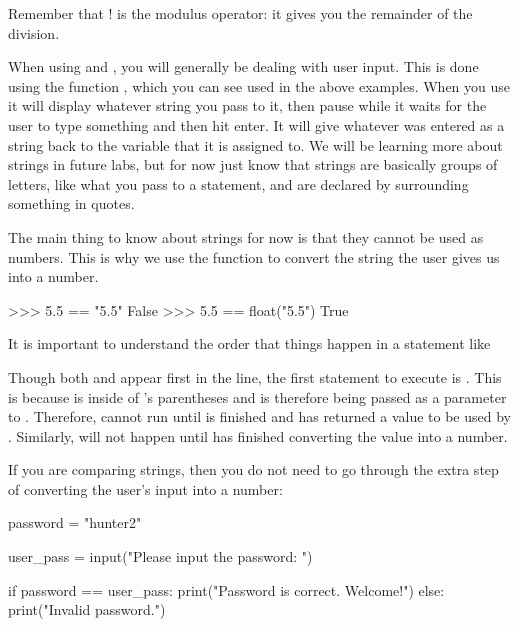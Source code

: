 \documentclass[11pt]{cselabheader}
\begin{document}
Remember that \pythoninline!%
is the modulus operator: it gives you the remainder of the division.

When using  and , you will generally be
dealing with user input. This is done using the function ,
which you can see used in the above examples. When you use 
it will display whatever string you pass to it, then pause while it waits for
the user to type something and then hit enter. It will give whatever was entered
as a string back to the variable that it is assigned to. We will be learning
more about strings in future labs, but for now just know that strings are
basically groups of letters, like what you pass to a 
statement, and are declared by surrounding something in quotes.

The main thing to know about strings for now is that they cannot be used as
numbers. This is why we use the  function to convert the
string the user gives us into a number.

\begin{pyconcode}
>>> 5.5 == "5.5"
False
>>> 5.5 == float("5.5")
True
\end{pyconcode}

It is important to understand the order that things happen in a statement like


Though both  and  appear first in the line, the
first statement to execute is . This is because
 is inside of 's parentheses and is therefore
being passed as a parameter to . Therefore, 
cannot run until  is finished and has returned a value to be
used by . Similarly,  will not happen until
 has finished converting the value into a number.

If you are comparing strings, then you do not need to go through the extra step
of converting the user's input into a number:

\begin{python3code}
password = "hunter2"

user_pass = input("Please input the password: ")

if password == user_pass:
    print("Password is correct. Welcome!")
else:
    print("Invalid password.")
\end{python3code}
\end{document}
